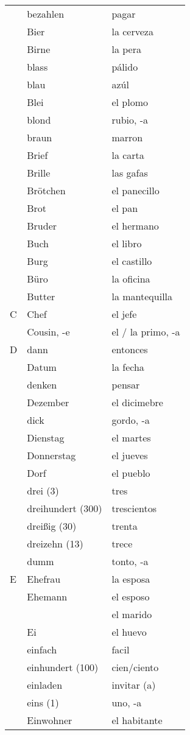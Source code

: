 \documentclass[10pt,spanish]{article}
\begin{document}
\begin{longtable}{p{} p{} | p{}}
& bezahlen & pagar  \\
& Bier & la cerveza  \\
& Birne & la pera  \\
& blass & pálido \\
& blau & azúl \\
& Blei & el plomo  \\
& blond & rubio, -a  \\
& braun & marron  \\
& Brief & la carta  \\
& Brille & las gafas  \\
& Brötchen & el panecillo  \\
& Brot & el pan \\
& Bruder & el hermano  \\
& Buch & el libro  \\
& Burg & el castillo \\
& Büro & la oficina \\
& Butter & la mantequilla  \\
C & Chef & el jefe  \\
& Cousin, -e & el / la primo, -a  \\
D & dann & entonces  \\
& Datum & la fecha  \\
& denken & pensar  \\
& Dezember & el dicimebre  \\
& dick & gordo, -a  \\
& Dienstag & el martes  \\
& Donnerstag & el jueves  \\
& Dorf & el pueblo  \\
& drei (3) & tres  \\
& dreihundert (300) & trescientos \\
& dreißig (30) & trenta  \\
& dreizehn (13) & trece  \\
& dumm & tonto, -a  \\
E & Ehefrau & la esposa  \\
& Ehemann & el esposo \\
& & el marido \\
& Ei & el huevo  \\
& einfach & facil  \\
& einhundert (100) & cien/ciento  \\
& einladen & invitar (a)\\
& eins (1) & uno, -a  \\
& Einwohner & el habitante \\

\end{longtable}
\end{document}
